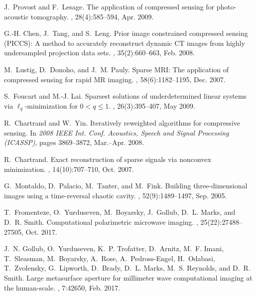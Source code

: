 \documentclass[10pt,twocolumn,romanappendices,final]{IEEEtran}
\begin{document}
\begin{thebibliography}{100}
J.~Provost and F.~Lesage.
\newblock The application of compressed sensing for photo-acoustic tomography.
, 28(4):585--594, Apr. 2009.

G.-H. Chen, J.~Tang, and S.~Leng.
\newblock Prior image constrained compressed sensing ({PICCS}): {A} method to
  accurately reconstruct dynamic {CT} images from highly undersampled
  projection data sets.
, 35(2):660--663, Feb. 2008.

M.~Lustig, D.~Donoho, and J.~M. Pauly.
\newblock Sparse {MRI}: {T}he application of compressed sensing for rapid {MR}
  imaging.
, 58(6):1182--1195, Dec. 2007.

S.~Foucart and M.-J. Lai.
\newblock Sparsest solutions of underdetermined linear systems via
  {$\ell_{q}$}-minimization for {$0 < q \leq 1$}.
, 26(3):395--407, May 2009.

R.~Chartrand and W.~Yin.
\newblock Iteratively reweighted algorithms for compressive sensing.
\newblock In {\em 2008 IEEE Int. Conf. Acoustics, Speech and Signal Processing
  (ICASSP)}, pages 3869--3872, Mar.--Apr. 2008.

R.~Chartrand.
\newblock Exact reconstruction of sparse signals via nonconvex minimization.
, 14(10):707--710, Oct. 2007.

G.~Montaldo, D.~Palacio, M.~Tanter, and M.~Fink.
\newblock Building three-dimensional images using a time-reversal chaotic
  cavity.
,
  52(9):1489--1497, Sep. 2005.

T.~Fromenteze, O.~Yurduseven, M.~Boyarsky, J.~Gollub, D.~L. Marks, and D.~R.
  Smith.
\newblock Computational polarimetric microwave imaging.
, 25(22):27488--27505, Oct. 2017.

J.~N. Gollub, O.~Yurduseven, K.~P. Trofatter, D.~Arnitz, M.~F. Imani,
  T.~Sleasman, M.~Boyarsky, A.~Rose, A.~Pedross-Engel, H.~Odabasi,
  T.~Zvolensky, G.~Lipworth, D.~Brady, D.~L. Marks, M.~S. Reynolds, and D.~R.
  Smith.
\newblock Large metasurface aperture for millimeter wave computational imaging
  at the human-scale.
, 7:42650, Feb. 2017.


\end{thebibliography}
\end{document}
